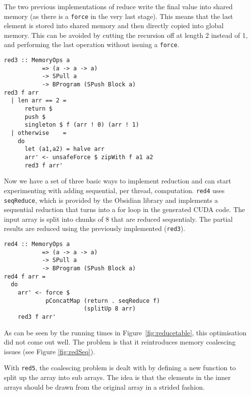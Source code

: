 
The two previous implementations of reduce write the final value into shared 
memory (as there is a {\tt force} 
in the very last stage). This means that the last element is stored into shared 
memory and then directly copied into global memory. This can be avoided by cutting 
the recursion off at length 2 instead of 1, and performing the last operation 
without issuing a {\tt force}. 

\begin{small} 
\begin{Verbatim}[samepage = true] 
red3 :: MemoryOps a
           => (a -> a -> a)
           -> SPull a
           -> BProgram (SPush Block a)
red3 f arr
  | len arr == 2 = 
      return $ 
      push $ 
      singleton $ f (arr ! 0) (arr ! 1) 
  | otherwise    = 
    do
      let (a1,a2) = halve arr
      arr' <- unsafeForce $ zipWith f a1 a2
      red3 f arr'
\end{Verbatim}
\end{small}



Now we have a set of three basic ways to implement reduction  and can start experimenting with adding 
sequential, per thread, computation. {\tt red4} uses
{\tt seqReduce}, which is provided by the Obsidian library and 
implements a sequential reduction that turns into a for loop in the generated 
CUDA code. The input array is split into 
chunks of 8 that are reduced sequentialy. The partial
results are reduced using the previously implemented ({\tt red3}). 

\begin{small}
\begin{Verbatim}[samepage = true] 
red4 :: MemoryOps a
           => (a -> a -> a)
           -> SPull a
           -> BProgram (SPush Block a)
red4 f arr =
  do
    arr' <- force $  
            pConcatMap (return . seqReduce f) 
                       (splitUp 8 arr)
    red3 f arr' 
\end{Verbatim}
\end{small}%

As can be seen by the running times in Figure~\ref{fig:reducetable}, this optimisation 
did not come out well. The problem is that it reintroduces memory coalescing issues (see Figure \ref{fig:redSeq}). 


With {\tt red5}, the coalescing problem is dealt with by defining a new 
function to split up the array into sub arrays. The idea is that the 
elements in the inner arrays should be drawn from the original array in a strided fashion. 


